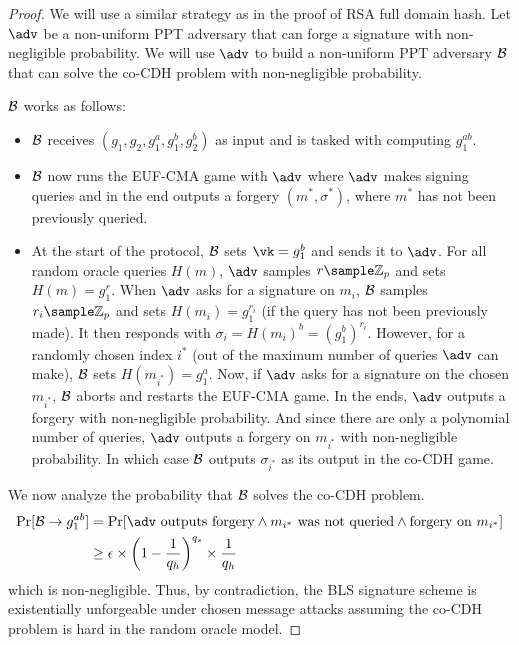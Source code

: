 \begin{proof}
    We will use a similar strategy as in the proof of RSA full domain hash. Let $\adv$ be a non-uniform PPT adversary that can forge a signature with non-negligible probability. We will use $\adv$ to build a non-uniform PPT adversary $\mathcal{B}$ that can solve the co-CDH problem with non-negligible probability.

    $\mathcal{B}$ works as follows:
    \begin{itemize}
        \item $\mathcal{B}$ receives $(g_1, g_2, g_1^a, g_1^b, g_2^b)$ as input and is tasked with computing $g_1^{ab}$.
        \item $\mathcal{B}$ now runs the EUF-CMA game with $\adv$ where $\adv$ makes signing queries and in the end outputs a forgery $(m^*, \sigma^*)$, where $m^*$ has not been previously queried.
        \item At the start of the protocol, $\mathcal{B}$ sets $\vk = g_1^b$ and sends it to $\adv$. For all random oracle queries $H(m)$, $\adv$ samples $r \sample \mathbb{Z}_p$ and sets $H(m) = g_1^r$. When $\adv$ asks for a signature on $m_i$, $\mathcal{B}$ samples $r_i \sample \mathbb{Z}_p$ and sets $H(m_i) = g_1^{r_i}$ (if the query has not been previously made). It then responds with $\sigma_i = H(m_i)^b = (g_1^b)^{r_i}$. However, for a randomly chosen index $i^*$ (out of the maximum number of queries $\adv$ can make), $\mathcal{B}$ sets $H(m_{i^*}) = g_1^a$. Now, if $\adv$ asks for a signature on the chosen $m_{i^*}$, $\mathcal{B}$ aborts and restarts the EUF-CMA game. In the ends, $\adv$ outputs a forgery with non-negligible probability. And since there are only a polynomial number of queries, $\adv$ outputs a forgery on $m_{i^*}$ with non-negligible probability. In which case $\mathcal{B}$ outputs $\sigma_{i^*}$ as its output in the co-CDH game.
    \end{itemize}

    We now analyze the probability that $\mathcal{B}$ solves the co-CDH problem.
    \begin{align*}
        \Pr[\advb \to g_1^{ab}] & = \Pr[\adv \text{ outputs forgery} \wedge m_{i^*} \text{ was not queried} \wedge \text{forgery on } m_{i^*}] \\
                                & \geq \epsilon \times \left( 1 -\frac{1}{q_h}\right)^{q_s} \times \frac{1}{q_h}
    \end{align*}
    which is non-negligible.
    Thus, by contradiction, the BLS signature scheme is existentially unforgeable under chosen message attacks assuming the co-CDH problem is hard in the random oracle model.
\end{proof}